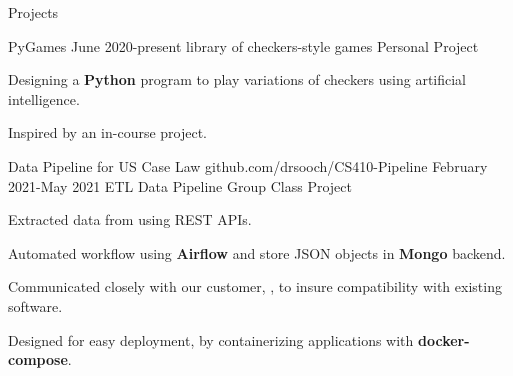 \documentclass{resume} %
\begin{document}
\begin{Section} {Projects}
	\begin{comment}
	\begin{Project} {TeXume}
		{\URL{https://github.com/jack17davis/TeXume}
			{github.com/jack17davis/TeXume/}}
		{August 2020-present}
		{LaTeX-based Resume Template}
		{Personal Project}
		\item Maintain a repository to share the \textbf{LaTeX} source code I use to generate my resume.
	\end{Project}
	\end{comment}

	\begin{Project} {PyGames}
		{}
		{June 2020-present}
		{library of checkers-style games}
		{Personal Project}
		\item Designing a \textbf{Python} program to play variations of checkers using artificial intelligence.
		\item Inspired by an in-course project.
	\end{Project}

	
	\begin{Project} {Data Pipeline for US Case Law}
		{
			{github.com/drsooch/CS410-Pipeline}}
		{February 2021-May 2021}
		{ETL Data Pipeline}
		{Group Class Project}
		\item Extracted data from  using REST APIs.
		\item Automated workflow using \textbf{Airflow} and store JSON objects in \textbf{Mongo} backend.
		\item Communicated closely with our customer, , to insure compatibility with existing software.
		\item Designed for easy deployment, by containerizing applications with \textbf{docker-compose}.
	\end{Project}


\end{Section}
\end{document}
